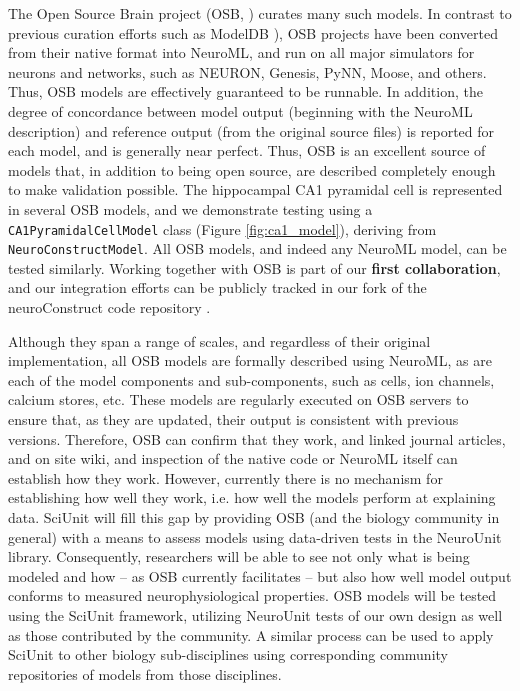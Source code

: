 \documentclass[11pt,letterpaper]{article}
\begin{document}
The Open Source Brain project (OSB, \cite{osb_url}) curates many such models. In contrast to previous curation efforts such as ModelDB \cite{modeldb_url,hines_modeldb:_2004}), OSB projects have been converted from their native format into NeuroML, and run on all major simulators for neurons and networks, such as NEURON, Genesis, PyNN, Moose, and others. Thus, OSB models are effectively guaranteed to be runnable.  In addition, the degree of concordance between model output (beginning with the NeuroML description) and reference output (from the original source files) is reported for each model, and is generally near perfect.  Thus, OSB is an excellent source of models that, in addition to being open source, are described completely enough to make validation possible.   The hippocampal CA1 pyramidal cell is represented in several OSB models, and we demonstrate testing using a \verb|CA1PyramidalCellModel| class (Figure \ref{fig:ca1_model}), deriving from \verb|NeuroConstructModel|.  All OSB models, and indeed any NeuroML model, can be tested similarly.  Working together with OSB is part of our \textbf{first collaboration}, and our integration efforts can be publicly tracked in our fork of the neuroConstruct code repository \cite{neuroconstruct_rgerkin_url}.  

Although they span a range of scales, and regardless of their original implementation, all OSB models are formally described using NeuroML, as are each of the model components and sub-components, such as cells, ion channels, calcium stores, etc.  These models are regularly executed on OSB servers to ensure that, as they are updated, their output is consistent with previous versions.  Therefore, OSB can confirm that they work, and linked journal articles, and on site wiki, and inspection of the native code or NeuroML itself can establish how they work. However, currently there is no mechanism for establishing how well they work, i.e. how well the models perform at explaining data.  SciUnit will fill this gap by providing OSB (and the biology community in general) with a means to assess models using data-driven tests in the NeuroUnit library.  Consequently, researchers will be able to see not only what is being modeled and how -- as OSB currently facilitates -- but also how well model output conforms to measured neurophysiological properties. OSB models will be tested using the SciUnit framework, utilizing NeuroUnit tests of our own design as well as those contributed by the community.  A similar process can be used to apply SciUnit to other biology sub-disciplines using corresponding community repositories of models from those disciplines.
\end{document}
